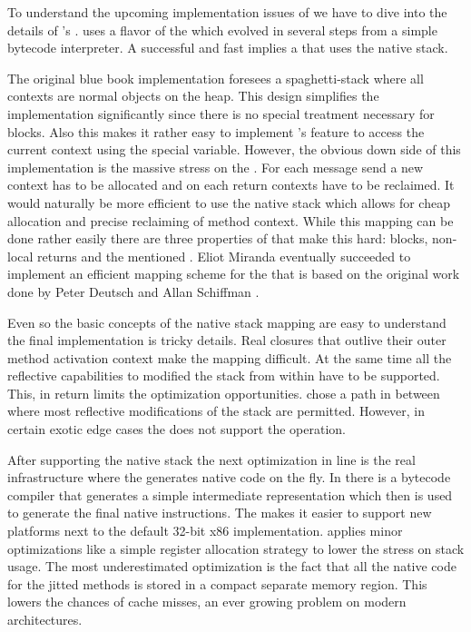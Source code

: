 To understand the upcoming implementation issues of \NBJ we have to dive into the details of \PH's \JIT.
\PH uses a flavor of the \Cog \VM which evolved in several steps from a simple bytecode interpreter.
A successful and fast \JIT implies a \VM that uses the native stack.

The original  blue book implementation foresees a spa\-ghet\-ti-stack where all contexts are normal objects on the heap.
This design simplifies the \VM implementation significantly since there is no special treatment necessary for blocks.
Also this makes it rather easy to implement \PH's feature to access the current context using the special  variable.
However, the obvious down side of this implementation is the massive stress on the \GC.
For each message send a new context has to be allocated and on each return contexts have to be reclaimed.
It would naturally be more efficient to use the native stack which allows for cheap allocation and precise reclaiming of method context.
While this mapping can be done rather easily there are three properties of \PH that make this hard: blocks, non-local returns and the mentioned .
Eliot Miranda eventually succeeded to implement an efficient mapping scheme for the \Cog \VM that is based on the original work done by Peter Deutsch and Allan Schiffman \cite{Deut84a}.

Even so the basic concepts of the native stack mapping are easy to understand the final implementation is tricky details.
Real closures that outlive their outer method activation context make the mapping difficult.
At the same time all the reflective capabilities to modified the stack from within \PH have to be supported.
This, in return limits the optimization opportunities.
\Cog chose a path in between where most reflective modifications of the stack are permitted.
However, in certain exotic edge cases the \VM does not support the operation.

After supporting the native stack the next optimization in line is the real \JIT infrastructure where the \VM generates native code on the fly.
In \Cog there is a bytecode compiler that generates a simple intermediate representation which then is used to generate the final native instructions.
The \IR makes it easier to support new platforms next to the default 32-bit x86 implementation.
\Cog applies minor optimizations like a simple register allocation strategy to lower the stress on stack usage.
The most underestimated optimization is the fact that all the native code for the jitted methods is stored in a compact separate memory region.
This lowers the chances of cache misses, an ever growing problem on modern \CPU architectures.

